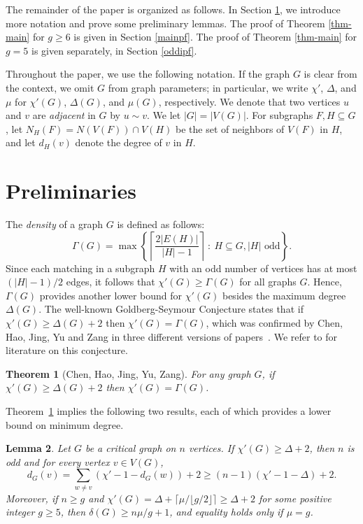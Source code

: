 \documentclass[12pt,oneside]{amsart}
\newtheorem{theorem}{Theorem}[section]
\newtheorem{lemma}[theorem]{Lemma}
\newcommand\roundup[1]{\left\lceil#1\right\rceil}
\begin{document}
The remainder of the paper is organized as follows. In Section \ref{prelim}, we introduce more notation and prove some preliminary lemmas. The proof of Theorem \ref{thm-main} for $g\geq 6$ is given in Section \ref{mainpf}.
The proof of Theorem \ref{thm-main} for $g=5$ is given separately, in Section \ref{oddipf}.


Throughout the paper, we use the following notation. If the graph \(G\) is clear from the context, we omit \(G\) from graph parameters; in particular, we write \(\chi'\), \(\Delta\), and \(\mu\) for \(\chi'(G)\), \(\Delta(G)\), and \(\mu(G)\), respectively.
We denote that two vertices \(u\) and \(v\) are {\it adjacent} in \(G\) by \(u \sim v\).
We let \(|G| = |V(G)|\).
For subgraphs \(F, H \subseteq G\), let
\(N_H(F) = N(V(F)) \cap V(H)\) be the set of neighbors of \(V(F)\) in \(H\),
and let \(d_H(v)\) denote the degree of \(v\) in \(H\).


\section{Preliminaries}\label{prelim}

The \textit{density} of a graph $G$ is defined  as follows:
\[\Gamma(G) = \max\left\{\roundup{\frac{2|E(H)|}{|H|-1}}\ : \ H\subseteq G, |H| \text{ odd}\right\}.\] Since each matching in a subgraph $H$ with an odd number of vertices has at most $(|H|-1)/2$ edges, it follows that  $\chi'(G)\geq \Gamma(G)$ for all graphs $G$. Hence, $\Gamma(G)$ provides another lower bound for $\chi'(G)$ besides the maximum degree $\Delta(G)$.
The well-known Goldberg-Seymour Conjecture states that if $\chi'(G)\ge \Delta(G) +2$ then $\chi'(G) =\Gamma(G)$, which was confirmed by Chen, Hao, Jing, Yu and Zang in three different versions of papers~\cite{chen2025proof,ChenHaoYuZang2024ShortGS,Jing2024EdgeColoring}. We refer to  \cite{MR2975974} for literature on this conjecture.

\begin{theorem}[Chen, Hao, Jing, Yu, Zang]\label{Thm-CJZ}
For any graph $G$, if $\chi'(G) \ge \Delta(G) +2$ then $\chi'(G) = \Gamma(G)$. \end{theorem}

Theorem~\ref{Thm-CJZ} implies the following two results, each of which provides a lower bound on minimum degree.


\begin{lemma} \label{critical}
    Let $G$ be a critical graph on $n$ vertices. If  $\chi'(G) \geq \Delta + 2$,
    then $n$ is odd and for every vertex $v\in V(G)$,
    $$d_{G}(v) = \sum_{w\ne v} (\chi' -1 -d_G(w)) +2  \ge (n-1)(\chi' -1 -\Delta) +2.$$
Moreover, if $n \ge g$ and $\chi'(G) = \Delta + \lceil \mu/\lfloor g/2 \rfloor\rceil \ge \Delta +2$ for some positive integer $g \ge 5$, then
    \( \delta(G) \ge  n\mu/g +1\), and  equality holds only if $\mu =g$.
    \end{lemma}
\end{document}
